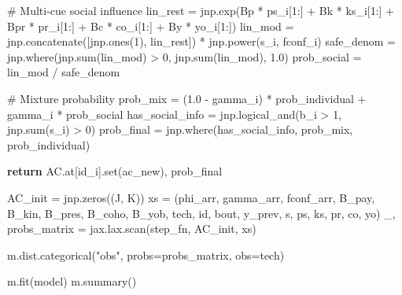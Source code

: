 \documentclass[
  letterpaper,
  DIV=11,
  numbers=noendperiod]{scrartcl}
\newenvironment{Shaded}{\begin{snugshade}}{\end{snugshade}}
\newcommand{\BuiltInTok}[1]{\textcolor[rgb]{0.00,0.23,0.31}{#1}}
\newcommand{\CommentTok}[1]{\textcolor[rgb]{0.37,0.37,0.37}{#1}}
\newcommand{\ControlFlowTok}[1]{\textcolor[rgb]{0.00,0.23,0.31}{\textbf{#1}}}
\newcommand{\DecValTok}[1]{\textcolor[rgb]{0.68,0.00,0.00}{#1}}
\newcommand{\FloatTok}[1]{\textcolor[rgb]{0.68,0.00,0.00}{#1}}
\newcommand{\NormalTok}[1]{\textcolor[rgb]{0.00,0.23,0.31}{#1}}
\newcommand{\OperatorTok}[1]{\textcolor[rgb]{0.37,0.37,0.37}{#1}}
\newcommand{\StringTok}[1]{\textcolor[rgb]{0.13,0.47,0.30}{#1}}
\begin{document}
\begin{Shaded}
\begin{Highlighting}[]
        \CommentTok{\# Multi{-}cue social influence}
\NormalTok{        lin\_rest }\OperatorTok{=}\NormalTok{ jnp.exp(Bp }\OperatorTok{*}\NormalTok{ ps\_i[}\DecValTok{1}\NormalTok{:] }\OperatorTok{+}\NormalTok{ Bk }\OperatorTok{*}\NormalTok{ ks\_i[}\DecValTok{1}\NormalTok{:] }\OperatorTok{+}\NormalTok{ Bpr }\OperatorTok{*}\NormalTok{ pr\_i[}\DecValTok{1}\NormalTok{:] }\OperatorTok{+}\NormalTok{ Bc }\OperatorTok{*}\NormalTok{ co\_i[}\DecValTok{1}\NormalTok{:] }\OperatorTok{+}\NormalTok{ By }\OperatorTok{*}\NormalTok{ yo\_i[}\DecValTok{1}\NormalTok{:])}
\NormalTok{        lin\_mod }\OperatorTok{=}\NormalTok{ jnp.concatenate([jnp.ones(}\DecValTok{1}\NormalTok{), lin\_rest]) }\OperatorTok{*}\NormalTok{ jnp.power(s\_i, fconf\_i)}
\NormalTok{        safe\_denom }\OperatorTok{=}\NormalTok{ jnp.where(jnp.}\BuiltInTok{sum}\NormalTok{(lin\_mod) }\OperatorTok{\textgreater{}} \DecValTok{0}\NormalTok{, jnp.}\BuiltInTok{sum}\NormalTok{(lin\_mod), }\FloatTok{1.0}\NormalTok{)}
\NormalTok{        prob\_social }\OperatorTok{=}\NormalTok{ lin\_mod }\OperatorTok{/}\NormalTok{ safe\_denom}

        \CommentTok{\# Mixture probability}
\NormalTok{        prob\_mix }\OperatorTok{=}\NormalTok{ (}\FloatTok{1.0} \OperatorTok{{-}}\NormalTok{ gamma\_i) }\OperatorTok{*}\NormalTok{ prob\_individual }\OperatorTok{+}\NormalTok{ gamma\_i }\OperatorTok{*}\NormalTok{ prob\_social}
\NormalTok{        has\_social\_info }\OperatorTok{=}\NormalTok{ jnp.logical\_and(b\_i }\OperatorTok{\textgreater{}} \DecValTok{1}\NormalTok{, jnp.}\BuiltInTok{sum}\NormalTok{(s\_i) }\OperatorTok{\textgreater{}} \DecValTok{0}\NormalTok{)}
\NormalTok{        prob\_final }\OperatorTok{=}\NormalTok{ jnp.where(has\_social\_info, prob\_mix, prob\_individual)}

        \ControlFlowTok{return}\NormalTok{ AC.at[id\_i].}\BuiltInTok{set}\NormalTok{(ac\_new), prob\_final}

\NormalTok{    AC\_init }\OperatorTok{=}\NormalTok{ jnp.zeros((J, K))}
\NormalTok{    xs }\OperatorTok{=}\NormalTok{ (phi\_arr, gamma\_arr, fconf\_arr, B\_pay, B\_kin, B\_pres, B\_coho, B\_yob,}
\NormalTok{          tech, }\BuiltInTok{id}\NormalTok{, bout, y\_prev, s, ps, ks, pr, co, yo)}
\NormalTok{    \_, probs\_matrix }\OperatorTok{=}\NormalTok{ jax.lax.scan(step\_fn, AC\_init, xs)}
    
\NormalTok{    m.dist.categorical(}\StringTok{"obs"}\NormalTok{, probs}\OperatorTok{=}\NormalTok{probs\_matrix, obs}\OperatorTok{=}\NormalTok{tech)}

\NormalTok{m.fit(model)}
\NormalTok{m.summary()}
\end{Highlighting}
\end{Shaded}
\end{document}
